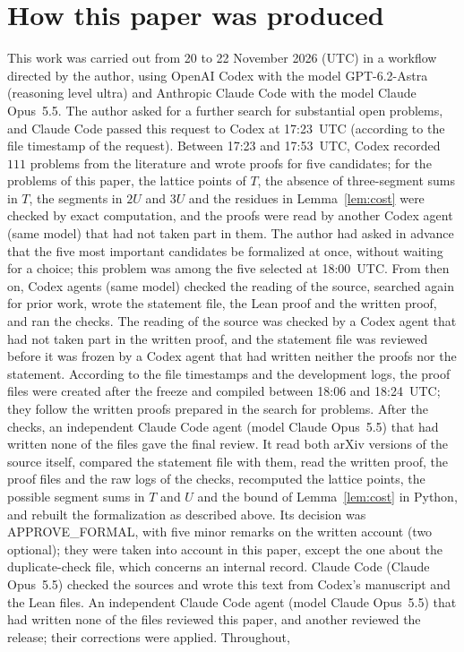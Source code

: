 \documentclass[11pt]{article}
\theoremstyle{definition}
\theoremstyle{remark}
\begin{document}
\section*{How this paper was produced}
This work was carried out from 20 to 22 November 2026 (UTC) in a workflow directed by
the author, using OpenAI Codex with the model GPT-6.2-Astra (reasoning level
ultra) and Anthropic Claude Code with the model Claude Opus~5.5. The author
asked for a further search for substantial open problems, and Claude Code
passed this request to Codex at 17:23~UTC (according to the file timestamp of
the request). Between 17:23 and 17:53~UTC, Codex recorded $111$ problems from
the literature and wrote proofs for five candidates; for the problems of this
paper, the lattice points of $T$, the absence of three-segment sums in $T$,
the segments in $2U$ and $3U$ and the residues in Lemma~\ref{lem:cost} were
checked by exact computation, and the proofs were read by another Codex agent
(same model) that had not taken part in them. The author had asked in advance
that the five most important candidates be formalized at once, without
waiting for a choice; this problem was among the five selected at 18:00~UTC.
From then on, Codex agents (same model) checked the reading of the source,
searched again for prior work, wrote the statement file, the Lean proof and
the written proof, and ran the checks. The reading of the source was checked
by a Codex agent that had not taken part in the written proof, and the
statement file was reviewed before it was frozen by a Codex agent that had
written neither the proofs nor the statement. According to the file
timestamps and the development logs, the proof files were created after the
freeze and compiled between 18:06 and 18:24~UTC; they follow the written proofs
prepared in the search for problems. After the checks, an independent Claude
Code agent (model Claude Opus~5.5) that had written none of the files gave the
final review. It read both arXiv versions of the source itself, compared the
statement file with them, read the written proof, the proof files and the raw
logs of the checks, recomputed the lattice points, the possible segment sums
in $T$ and $U$ and the bound of Lemma~\ref{lem:cost} in Python, and rebuilt
the formalization as described above. Its decision was APPROVE\_FORMAL, with
five minor remarks on the written account (two optional); they were taken
into account in this paper, except the one about the duplicate-check file,
which concerns an internal record. Claude Code (Claude Opus~5.5) checked the sources and wrote this
text from Codex's manuscript and the Lean files. An independent Claude Code agent (model Claude Opus~5.5) that had written none of the files reviewed this paper, and another reviewed the release; their corrections were applied. Throughout,
\end{document}
